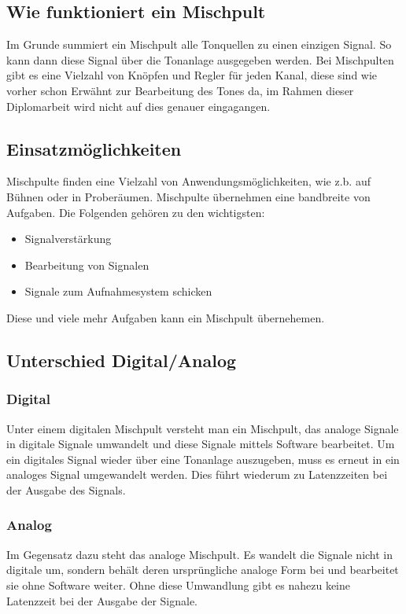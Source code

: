 \subsection{Wie funktioniert ein Mischpult}
Im Grunde summiert ein Mischpult alle Tonquellen zu einen einzigen Signal. So kann dann diese Signal über die Tonanlage ausgegeben werden. Bei Mischpulten gibt es eine Vielzahl von Knöpfen und Regler für jeden Kanal, diese sind wie vorher schon Erwähnt zur Bearbeitung des Tones da, im Rahmen dieser Diplomarbeit wird nicht auf dies genauer eingagangen.
\cite{Mischpult_Erklärung}

\subsection{Einsatzmöglichkeiten}
Mischpulte finden eine Vielzahl von Anwendungsmöglichkeiten, wie z.b. auf Bühnen oder in Proberäumen. Mischpulte übernehmen eine bandbreite von Aufgaben. Die Folgenden gehören zu den wichtigsten:
\begin{itemize}
	\item Signalverstärkung
	\item Bearbeitung von Signalen
	\item Signale zum Aufnahmesystem schicken
\end{itemize}
Diese und viele mehr Aufgaben kann ein Mischpult übernehemen.
\cite{Mischpult_Verwendungszweck}

\subsection{Unterschied Digital/Analog}
\subsubsection{Digital}
Unter einem digitalen Mischpult versteht man ein Mischpult, das analoge Signale in digitale Signale umwandelt und diese Signale mittels Software bearbeitet. Um ein digitales Signal wieder über eine Tonanlage auszugeben, muss es erneut in ein analoges Signal umgewandelt werden. Dies führt wiederum zu Latenzzeiten bei der Ausgabe des Signals.
\subsubsection{Analog}
Im Gegensatz dazu steht das analoge Mischpult. Es wandelt die Signale nicht in digitale um, sondern behält deren ursprüngliche analoge Form bei und bearbeitet sie ohne Software weiter. Ohne diese Umwandlung gibt es nahezu keine Latenzzeit bei der Ausgabe der Signale.
\cite{Mischpult_Analog/Digital}

